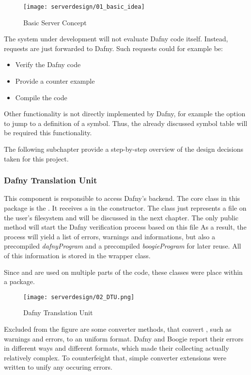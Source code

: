 \begin{figure}[H]
    \centering
    \texttt{[image: serverdesign/01\_basic\_idea]}
    \caption{Basic Server Concept}
    \label{fig:server_basic_idea}
\end{figure}

The system under development will not evaluate Dafny code itself.
Instead, requests are just forwarded to Dafny.
Such requests could for example be:
\begin{itemize}
    \item Verify the Dafny code
    \item Provide a counter example
    \item Compile the code
\end{itemize}

Other functionality is not directly implemented by Dafny, for example the option to jump to a definition of a symbol.
Thus, the already discussed symbol table will be required this functionality.

The following subchapter provide a step-by-step overview of the design decisions taken for this project.

\subsubsection{Dafny Translation Unit}
This component is responsible to access Dafny's backend.
The core class in this package is the .
It receives a  in the constructor.
The class  just represents a file on the user's filesystem and will be discussed in the next chapter.
The only public method  will start the Dafny verification process based on this file
 As a result, the process will yield a list of errors, warnings and informations, but also a precompiled \textit{dafnyProgram} and a precompiled \textit{boogieProgram} for later reuse.
 All of this information is stored in the  wrapper class.

Since  and  are used on multiple parts of the code, these classes were place within a  package.

\begin{figure}[H]
    \centering
    \texttt{[image: serverdesign/02\_DTU.png]}
    \caption{Dafny Translation Unit}
    \label{fig:server_dtu}
\end{figure}

Excluded from the figure are some converter methods, that convert , such as warnings and errors, to an uniform format.
Dafny and Boogie report their errors in different ways and different formats, which made their collecting actually relatively complex.
To counterfeight that, simple converter extensions were written to unify any occuring errors.

